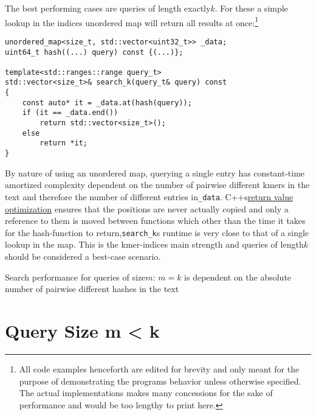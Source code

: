 The best performing cases are queries of length exactly$k$. For these
a simple lookup in the indices unordered map will return all results
at once:\footnote{All code examples henceforth are edited for brevity and only meant
for the purpose of demonstrating the programs behavior unless otherwise
specified. The actual implementations makes many concessions for the
sake of performance and would be too lengthy to print here.}
\begin{lyxcode}
\begin{lstlisting}[caption={Search function for queries of size k.},language={[GNU]C++},tabsize=4]
unordered_map<size_t, std::vector<uint32_t>> _data;
uint64_t hash((...) query) const {(...)};

template<std::ranges::range query_t>
std::vector<size_t>& search_k(query_t& query) const
{
	const auto* it = _data.at(hash(query));
	if (it == _data.end())
		return std::vector<size_t>();
	else
		return *it;
}
\end{lstlisting}

\end{lyxcode}
By nature of using an unordered map, querying a single entry has constant-time
amortized complexity dependent on the number of pairwise different
kmers in the text and therefore the number of different entries in\lstinline{_data}.
C++s\href{https://en.cppreference.com/w/cpp/language/copy_elision}{return value optimization}
ensures that the positions are never actually copied and only a reference
to them is moved between functions which other than the time it takes
for the hash-function to return,\lstinline{search_k}s runtime is
very close to that of a single lookup in the map. This is the kmer-indices
main strength and queries of length$k$ should be considered a best-case
scenario.
\begin{lem}
\label{Lemma 1}Search performance for queries of size$m:\,m=k$ is
dependent on the absolute number of pairwise different hashes in the
text
\end{lem}

\section{\label{section m < k}Query Size m < k}

